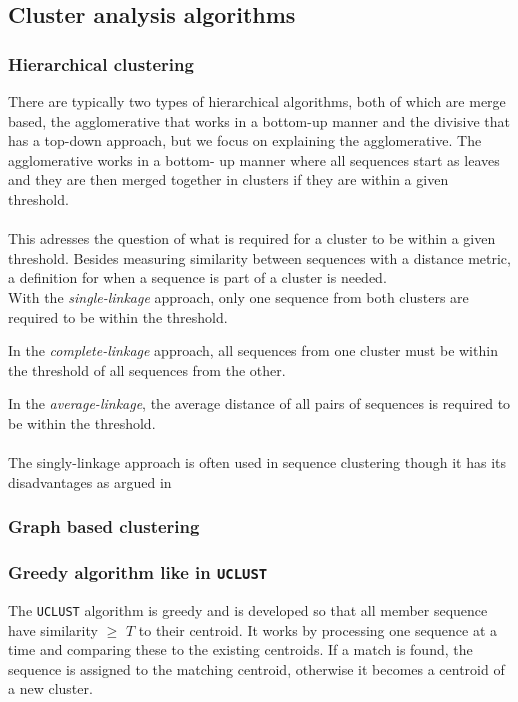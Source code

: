 \subsection{Cluster analysis algorithms}

\subsubsection{Hierarchical clustering}
There are typically two types of hierarchical algorithms, both of which are 
merge based, the agglomerative that works in a bottom-up manner and the 
divisive that has a top-down approach, but we focus on explaining the 
agglomerative. The agglomerative works in a bottom-
up manner where all sequences start as leaves and they are then merged 
together in clusters if they are within a given threshold.\\
\\%
This adresses the question of what is required for a cluster to be within a 
given threshold. Besides measuring similarity between sequences with a 
distance metric, a definition for when a sequence is part of a cluster is 
needed. \\

With the \textit{single-linkage} approach, only one sequence from both 
clusters are required to be within the threshold.

In the \textit{complete-linkage} approach, all sequences from one cluster 
must be within the threshold of all sequences from the other.

In the \textit{average-linkage}, the average distance of all pairs of 
sequences is required to be within the threshold.\\
\\
The singly-linkage approach is often used in sequence clustering though it has its disadvantages as argued in \cite[pp. 62-63]{dong}

\subsubsection{Graph based clustering}


\subsubsection{Greedy algorithm like in \texttt{UCLUST}} 
The \texttt{UCLUST} algorithm is greedy and is developed so that all member
sequence have similarity $\geq$ $T$ to their centroid.  It works by processing
one sequence at a time and comparing these to the existing centroids. If a
match is found, the sequence is assigned to the matching centroid, otherwise it
becomes a centroid of a new cluster.

